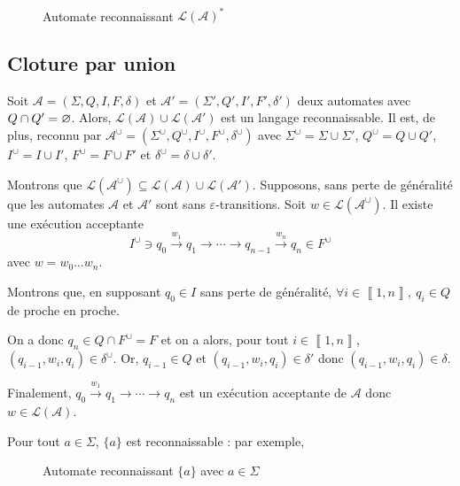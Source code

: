 \begin{exm}~
	\begin{figure}[H]
		\centering
		\caption{Automate reconnaissant $\mathcal{L}(\mathcal{A})^*$}
	\end{figure}
\end{exm}

\subsection{Cloture par union}

\begin{prop}
	Soit $\mathcal{A} = (\Sigma, Q, I, F, \delta)$\/ et $\mathcal{A}' = (\Sigma', Q', I', F', \delta')$\/ deux automates avec $Q \cap Q' = \varnothing$. Alors, $\mathcal{L}(\mathcal{A}) \cup \mathcal{L}(\mathcal{A}')$\/ est un langage reconnaissable.
	Il est, de plus, reconnu par $\mathcal{A}^\cup = (\Sigma^\cup, Q^\cup, I^\cup, F^\cup, \delta^\cup)$\/ avec $\Sigma^\cup  = \Sigma\cup \Sigma'$, $Q^\cup = Q \cup Q'$, $I^\cup = I \cup I'$, $F^\cup = F \cup F'$\/ et $\delta^\cup = \delta\cup \delta'$.
\end{prop}

\begin{prv}
	Montrons que $\mathcal{L}(\mathcal{A}^\cup) \subseteq \mathcal{L}(\mathcal{A}) \cup \mathcal{L}(\mathcal{A}')$. Supposons, sans perte de généralité que les automates $\mathcal{A}$\/ et $\mathcal{A}'$\/ sont sans $\varepsilon$-transitions.
	Soit $w \in \mathcal{L}(\mathcal{A}^\cup)$. Il existe une exécution acceptante \[
		I^\cup \ni q_0 \xrightarrow{w_1} q_1 \to \cdots \to q_{n-1} \xrightarrow{w_n} q_n \in F^\cup
	\] avec $w = w_0\ldots w_{n}$.

	Montrons que, en supposant $q_0 \in I$\/ sans perte de généralité, $\forall i \in \left\llbracket 1,n \right\rrbracket,\:q_i \in Q$ de proche en proche.

	On a donc $q_n \in Q \cap F^\cup = F$ et on a alors, pour tout $i \in \left\llbracket 1,n \right\rrbracket$, $(q_{i-1},w_i, q_i) \in \delta^\cup$. Or, $q_{i-1} \in Q$\/ et $(q_{i-1}, w_i, q_i) \in \delta'$\/ donc $(q_{i-1}, w_i, q_i) \in \delta$.

	Finalement, $q_0 \xrightarrow{w_1} q_1 \to \cdots \to q_n$\/ est un exécution acceptante de $\mathcal{A}$ donc $w \in \mathcal{L}(\mathcal{A})$.
\end{prv}

\begin{rmk}
	Pour tout $a \in \Sigma$, $\{a\}$\/ est reconnaissable : par exemple, 
	\begin{figure}[H]
		\centering
		\caption{Automate reconnaissant $\{a\}$ avec $a \in \Sigma$}
	\end{figure}
\end{rmk}

